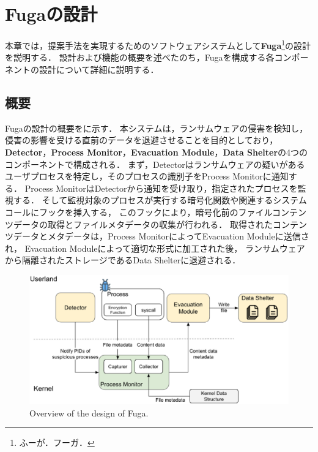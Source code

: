 \chapter{Fugaの設計}
\label{chap:design}
本章では，提案手法を実現するためのソフトウェアシステムとして\textbf{Fuga}\footnote{ふーが．フーガ．}の設計を説明する．
設計および機能の概要を述べたのち，Fugaを構成する各コンポーネントの設計について詳細に説明する．
\section{概要}
Fugaの設計の概要をに示す．
本システムは，ランサムウェアの侵害を検知し，侵害の影響を受ける直前のデータを退避させることを目的としており，
\textbf{Detector}，\textbf{Process Monitor}，\textbf{Evacuation Module}，\textbf{Data Shelter}の4つのコンポーネントで構成される．
まず，Detectorはランサムウェアの疑いがあるユーザプロセスを特定し，そのプロセスの識別子をProcess Monitorに通知する．
Process MonitorはDetectorから通知を受け取り，指定されたプロセスを監視する．
そして監視対象のプロセスが実行する暗号化関数や関連するシステムコールにフックを挿入する，
このフックにより，暗号化前のファイルコンテンツデータの取得とファイルメタデータの収集が行われる．
取得されたコンテンツデータとメタデータは，Process MonitorによってEvacuation Moduleに送信され，
Evacuation Moduleによって適切な形式に加工された後，
ランサムウェアから隔離されたストレージであるData Shelterに退避される．

\begin{figure}[t]
  \centering
  \includegraphics[width=\columnwidth]{doc/img/system_overview.eps}
  \caption{Overview of the design of Fuga.}
  \label{fig:system-architecture}
\end{figure}

